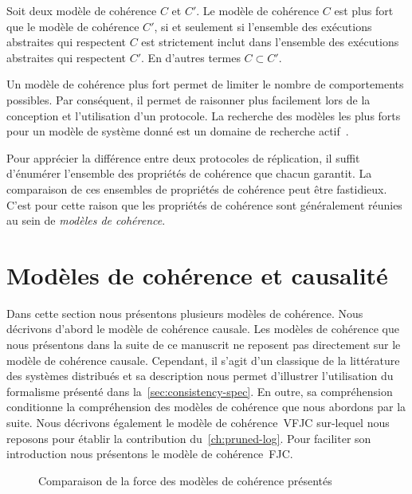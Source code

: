 \begin{definition}\label{def:consistency-hierearchy}
Soit deux modèle de cohérence $C$ et $C'$.
Le modèle de cohérence $C$ est plus fort que le modèle de cohérence $C'$, si et seulement si l'ensemble des exécutions abstraites qui respectent $C$ est strictement inclut dans l'ensemble des exécutions abstraites qui respectent $C'$.
En d'autres termes $C \subset C'$.
\end{definition}

Un modèle de cohérence plus fort permet de limiter le nombre de comportements possibles.
Par conséquent, il permet de raisonner plus facilement lors de la conception et l'utilisation d'un protocole.
La recherche des modèles les plus forts pour un modèle de système donné est un domaine de recherche actif~\cite{mahajan_2011_cac,guerraoui_2016_tradeoffs-replication}.


Pour apprécier la différence entre deux protocoles de réplication, il suffit d'énumérer l'ensemble des propriétés de cohérence que chacun garantit.
La comparaison de ces ensembles de propriétés de cohérence peut être fastidieux.
C'est pour cette raison que les propriétés de cohérence sont généralement réunies au sein de \emph{modèles de cohérence}.


\section{Modèles de cohérence et causalité}\label{sec:causal-models}

Dans cette section nous présentons plusieurs modèles de cohérence.
Nous décrivons d'abord le modèle de cohérence causale.
Les modèles de cohérence que nous présentons dans la suite de ce manuscrit ne reposent pas directement sur le modèle de cohérence causale.
Cependant, il s'agit d'un classique de la littérature des systèmes distribués et sa description nous permet d'illustrer l'utilisation du formalisme présenté dans la~\autoref{sec:consistency-spec}.
En outre, sa compréhension conditionne la compréhension des modèles de cohérence que nous abordons par la suite.
Nous décrivons également le modèle de cohérence~\acf{VFJC} sur-lequel nous reposons pour établir la contribution du~\autoref{ch:pruned-log}.
Pour faciliter son introduction nous présentons le modèle de cohérence~\acf{FJC}.

\begin{figure}[htb]
\centering
{}
\caption{Comparaison de la force des modèles de cohérence présentés}\label{fig:causal-fjc-vfjc-order}
\end{figure}

